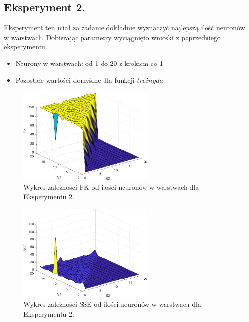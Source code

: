 \documentclass[a4paper, openright, twoside,11pt]{article}
\begin{document}
    \subsection{Eksperyment 2.}
    Eksperyment ten miał za zadanie dokładnie wyznaczyć najlepszą ilość neuronów w warstwach. Dobierając parametry wyciągnięto wnioski z poprzedniego eksperymentu.
      \begin{itemize}
        \item Neurony w warstwach: od 1 do 20 z krokiem co 1
        \item Pozostałe wartości domyślne dla funkcji $traingda$
       \end{itemize}
         \begin{figure}[!h]
            \centering
            \includegraphics[width = 0.6\textwidth]{Grafika/eksperymenty/pk2.png}
            \caption {Wykres zależności PK od ilości neuronów w warstwach dla Eksperymentu 2.}
            \label{fig:PKeksperyment2}
        \end{figure}
        \begin{figure}[!h]
            \centering
            \includegraphics[width = 0.6\textwidth]{Grafika/eksperymenty/sse2.png}
            \caption {Wykres zależności SSE od ilości neuronów w warstwach dla Eksperymentu 2.}
            \label{fig:PKeksperyment2}
        \end{figure}   
        
\end{document}
